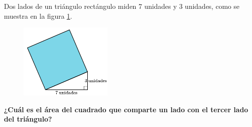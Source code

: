 Dos lados de un triángulo rectángulo miden 7 unidades y 3 unidades, como se muestra en la figura \ref{fig:area09}.
\begin{figure}[H]
    \begin{center}
        \includegraphics[width=0.4\textwidth]{../images/area09.png}
    \end{center}
    \caption{}
    \label{fig:area09}
\end{figure}
\textbf{¿Cuál es el área del cuadrado que comparte un lado con el tercer lado del triángulo?}